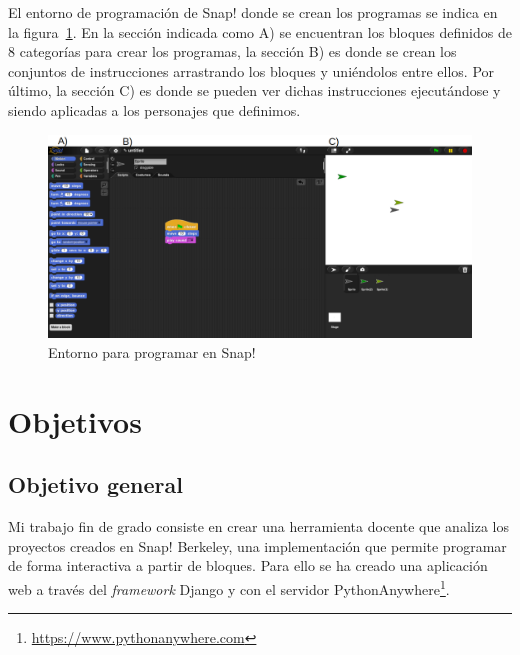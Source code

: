 \documentclass[a4paper, 12pt]{book}
\begin{document}
El entorno de programación de Snap! donde se crean los programas se indica en la figura~\ref{figura:entorno_snapp}. En la sección indicada como A) se encuentran los bloques definidos de 8 categorías para crear los programas, la sección B) es donde se crean los conjuntos de instrucciones arrastrando los bloques y uniéndolos entre ellos. Por último, la sección C) es donde se pueden ver dichas instrucciones ejecutándose y siendo aplicadas a los personajes que definimos.
\begin{figure}[h]
        \centering
        \includegraphics[scale=0.35]{img/entorno.png}
        \caption{Entorno para programar en Snap!}
        \label{figura:entorno_snapp}
\end{figure}

\cleardoublepage %
\chapter{Objetivos} %
\label{chap:objetivos} %

\section{Objetivo general} %
\label{sec:objetivo-general} %

Mi trabajo fin de grado consiste en crear una herramienta docente que analiza los proyectos creados en Snap! Berkeley, una implementación que permite programar de forma interactiva a partir de bloques. Para ello se ha creado una aplicación web a través del \emph{framework} Django y con el servidor PythonAnywhere\footnote{\url{https://www.pythonanywhere.com}}.
\end{document}
